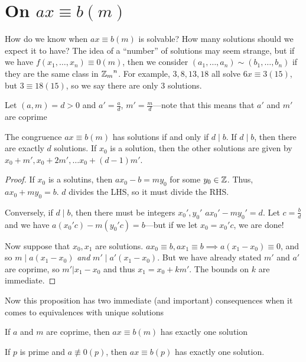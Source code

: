 \section{On \(ax \equiv b (m)\)}%
\label{sec:axeqb}
How do we know when \(ax \equiv b (m)\) is solvable? How many solutions should
we expect it to have? The idea of a ``number'' of solutions may seem strange,
but if we have \(f(x_1, \dots , x_n)\equiv 0 (m)\), then we consider
\((a_1, \dots,a_n) \sim (b_1, \dots,b_n)\) if they are the same class in
\({\mathbb{Z}_m}^n\). For example, \(3,8,13,18\) all solve \(6x\equiv 3 (15)\), but
\(3\equiv 18 (15)\), so we say there are only 3 solutions.

Let \((a,m) = d>0\)  and \(a'=\frac{a}{d}\), \(m'=\frac{m}{d}\)---note that
this means that \(a'\) and \(m'\) are coprime

\begin{prop}
  The congruence \(ax \equiv b (m)\) has solutions if and only if \(d \mid b\).
  If \(d\mid b\), then there are exactly \(d\) solutions. If \(x_0\) is a
  solution, then the other solutions are given by \(x_0+m', x_0+2m', \dots x_0+(d-1)m'\).
\end{prop}

\begin{proof}
  If \(x_0\) is a solutins, then \(a x_0-b =m y_0\) for some \(y_0 \in \mathbb{Z} \).
  Thus, \(a x_0 + m y_0=b\). \(d\) divides the LHS, so it must divide the RHS.

  Conversely, if \(d \mid b\), then there must be integers \(x_0', y_0'\) \st
  \(a x_0'-m y_0' = d\). Let \(c=\frac{b}{d}\) and we have
  \(a(x_0'c)-m(y_0'c)=b\)---but if we let \(x_0=x_0'c\), we are done!

  Now suppose that \(x_0,x_1\) are solutions.
  \(a x_0\equiv b, a x_1\equiv b \implies a(x_1-x_0)\equiv 0\), and so
  \(m\mid a(x_1-x_0)\) \emph{and} \(m'\mid a'(x_1-x_0)\). But we have already
  stated \(m'\) and \(a'\) are coprime, so \(m'|x_1-x_0\) and thus
  \(x_1=x_0+km'\). The bounds on \(k\) are immediate.
\end{proof}

Now this proposition has two immediate (and important) consequences when it comes
to equivalences with unique solutions

\begin{corollary}
  If \(a\) and \(m\) are coprime, then \(ax \equiv b (m)\) has exactly one solution
\end{corollary}

\begin{corollary}
If \(p\) is prime and \(a \not\equiv 0(p)\), then \(ax\equiv b (p)\) has exactly
one solution.
\end{corollary}

